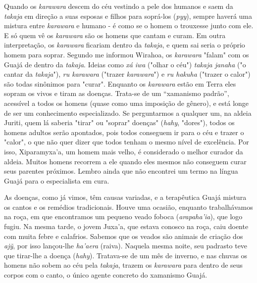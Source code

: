 Quando os \emph{karawara} descem do céu vestindo a pele dos humanos e
saem da \emph{takaja} em direção a suas esposas e filhos para soprá-los
(\emph{pyy}), sempre haverá uma mistura entre \emph{karawara} e humano -
é como se o homem o trouxesse junto com ele. E só quem vê os
\emph{karawara} são os homens que cantam e curam. Em outra
interpretação, os \emph{karawara} ficariam dentro da \emph{takaja}, e
quem sai seria o próprio homem para soprar. Segundo me informou Wirahoa,
os \emph{karawara} "falam" com os Guajá de dentro da \emph{takaja}.
Ideias como \emph{xá} \emph{iwa} ("olhar o céu") \emph{takaja janaha}
("o cantar da \emph{takaja}"), \emph{ru karawara} ("trazer
\emph{karawara}") e \emph{ru hakuha} ("trazer o calor") são todas
sinônimos para "curar". Enquanto os \emph{karawara} estão em Terra eles
sopram os vivos e tiram as doenças. Trata-se de um ``xamanismo padrão'',
acessível a todos os homens (quase como uma imposição de gênero), e está
longe de ser um conhecimento especializado. Se perguntarmos a qualquer
um, na aldeia Juriti, quem lá saberia "tirar" ou "soprar" doenças"
(\emph{hahy}, "dores"), todos os homens adultos serão apontados, pois
todos conseguem ir para o céu e trazer o "calor", o que não quer dizer
que todos tenham o mesmo nível de excelência. Por isso, Xiparamyxa'a, um
homem mais velho, é considerado o melhor curador da aldeia. Muitos
homens recorrem a ele quando eles mesmos não conseguem curar seus
parentes próximos. Lembro ainda que não encontrei um termo na língua
Guajá para o especialista em cura.

As doenças, como já vimos, têm causas variadas, e a terapêutica Guajá
mistura os cantos e os remédios tradicionais. Houve uma ocasião,
enquanto trabalhávamos na roça, em que encontramos um pequeno veado
foboca (\emph{arapaha'ia}), que logo fugiu. Na mesma tarde, o jovem
Juxa'a, que estava conosco na roça, caiu doente com muita febre e
calafrios. Sabemos que os veados são animais de criação dos \emph{ajỹ},
por isso lançou-lhe \emph{ha'aera} (raiva). Naquela mesma noite, seu
padrasto teve que tirar-lhe a doença (\emph{hahy}). Tratava-se de um mês
de inverno, e nas chuvas os homens não sobem ao céu pela \emph{takaja},
trazem os \emph{karawara} para dentro de seus corpos com o canto, o
único agente concreto do xamanismo Guajá.

